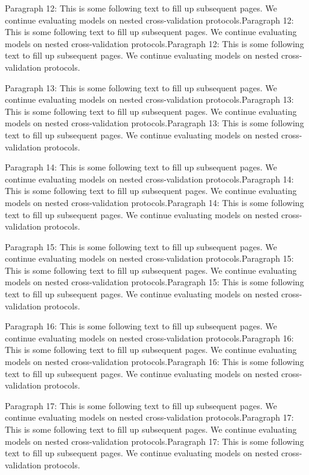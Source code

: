 \documentclass{IEEEtran}
\begin{document}
Paragraph 12: This is some following text to fill up subsequent pages. We continue evaluating models on nested cross-validation protocols.Paragraph 12: This is some following text to fill up subsequent pages. We continue evaluating models on nested cross-validation protocols.Paragraph 12: This is some following text to fill up subsequent pages. We continue evaluating models on nested cross-validation protocols.

Paragraph 13: This is some following text to fill up subsequent pages. We continue evaluating models on nested cross-validation protocols.Paragraph 13: This is some following text to fill up subsequent pages. We continue evaluating models on nested cross-validation protocols.Paragraph 13: This is some following text to fill up subsequent pages. We continue evaluating models on nested cross-validation protocols.

Paragraph 14: This is some following text to fill up subsequent pages. We continue evaluating models on nested cross-validation protocols.Paragraph 14: This is some following text to fill up subsequent pages. We continue evaluating models on nested cross-validation protocols.Paragraph 14: This is some following text to fill up subsequent pages. We continue evaluating models on nested cross-validation protocols.

Paragraph 15: This is some following text to fill up subsequent pages. We continue evaluating models on nested cross-validation protocols.Paragraph 15: This is some following text to fill up subsequent pages. We continue evaluating models on nested cross-validation protocols.Paragraph 15: This is some following text to fill up subsequent pages. We continue evaluating models on nested cross-validation protocols.

Paragraph 16: This is some following text to fill up subsequent pages. We continue evaluating models on nested cross-validation protocols.Paragraph 16: This is some following text to fill up subsequent pages. We continue evaluating models on nested cross-validation protocols.Paragraph 16: This is some following text to fill up subsequent pages. We continue evaluating models on nested cross-validation protocols.

Paragraph 17: This is some following text to fill up subsequent pages. We continue evaluating models on nested cross-validation protocols.Paragraph 17: This is some following text to fill up subsequent pages. We continue evaluating models on nested cross-validation protocols.Paragraph 17: This is some following text to fill up subsequent pages. We continue evaluating models on nested cross-validation protocols.
\end{document}
